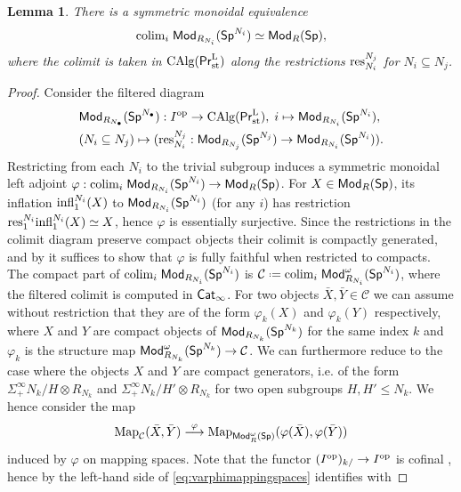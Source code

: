 \documentclass[reqno]{amsart}
\numberwithin{equation}{section}\theoremstyle{thms}
\newtheorem{lem}[equation]{Lemma}
\theoremstyle{defn}
\newcommand{\cC}{\mathcal{C}}
\newcommand{\tn}[1]{\textnormal{#1}}
\newcommand{\tsf}[1]{\textsf{\textup{#1}}}
\newcommand*{\defeq}{\mathrel{\vcenter{\baselineskip0.4ex \lineskiplimit0pt
\hbox{\scriptsize.}\hbox{\scriptsize.}}}%
=}
\newcommand{\op}{\tn{op}}
\newcommand{\Map}{\tn{Map}}
\newcommand{\calg}{\tn{CAlg}}
\newcommand{\Mod}{\tsf{Mod}}
\newcommand{\spec}{\tsf{Sp}}
\newcommand{\catinf}{\tsf{Cat}_{\infty}}
\newcommand{\prlst}{\tsf{Pr}^{\tn{L}}_{\tn{st}}}
\begin{document}
\begin{lem}\label{lem:spectraascolimit}
There is a symmetric monoidal equivalence 
$$\tn{colim}_i \; \Mod_{R_{N_i}}(\spec^{N_i}) \simeq \Mod_{R}(\spec),$$
where the colimit is taken in $\calg(\prlst)$ along the restrictions $\tn{res}^{N_j}_{N_i}$ for $N_i \subseteq N_j$.
\end{lem}
\begin{proof}
Consider the filtered diagram 
\begin{align*}
&\Mod_{R_{N_{\bullet}}}(\spec^{N_\bullet}): I^\op \to \calg(\prlst), \; i \mapsto \Mod_{R_{N_i}}(\spec^{N_i}), \\
&(N_i \subseteq N_j) \mapsto (\tn{res}_{N_i}^{N_j}: \Mod_{R_{N_j}}(\spec^{N_j}) \to \Mod_{R_{N_i}}(\spec^{N_i})).
\end{align*}
Restricting from each $N_i$ to the trivial subgroup induces a symmetric monoidal left adjoint $\varphi: \tn{colim}_i \; \Mod_{R_{N_i}}(\spec^{N_i}) \to \Mod_{R}(\spec)$. For $X \in \Mod_{R}(\spec)$, its inflation $\tn{infl}^{N_i}_1(X)$ to $\Mod_{R_{N_i}}(\spec^{N_i})$ (for any $i$) has restriction $\tn{res}^{N_i}_1\tn{infl}^{N_i}_1(X) \simeq X$, hence $\varphi$ is essentially surjective. Since the restrictions in the colimit diagram preserve compact objects their colimit is compactly generated, and by \cite[Proposition 5.3.5.11]{lur09} it suffices to show that $\varphi$ is fully faithful when restricted to compacts. \\
The compact part of $\tn{colim}_i \; \Mod_{R_{N_i}}(\spec^{N_i})$ is $\cC \defeq \tn{colim}_i \; \Mod_{R_{N_i}}^{\omega}(\spec^{N_i})$, where the filtered colimit is computed in $\catinf$. For two objects $\bar{X}, \bar{Y} \in \cC$ we can assume without restriction that they are of the form $\varphi_k(X)$ and $\varphi_k(Y)$ respectively, where $X$ and $Y$ are compact objects of $\Mod_{R_{N_k}}(\spec^{N_k})$ for the same index $k$ and $\varphi_k$ is the structure map $\Mod_{R_{N_k}}^{\omega}(\spec^{N_k}) \to \cC$. We can furthermore reduce to the case where the objects $X$ and $Y$ are compact generators, i.e. of the form $\Sigma^{\infty}_+ N_k/H \otimes R_{N_k}$ and $\Sigma^{\infty}_+ N_k/H' \otimes R_{N_k}$ for two open subgroups $H,H' \leq N_k$. We hence consider the map
\begin{equation}\label{eq:varphimappingspaces}
\Map_{\cC}(\bar{X},\bar{Y}) \stackrel{\varphi}{\longrightarrow} \Map_{\Mod_{R}^{\omega}(\spec)}(\varphi(\bar{X}),\varphi(\bar{Y}))
\end{equation}
induced by $\varphi$ on mapping spaces. Note that the functor $(I^\op)_{k/} \to I^\op$ is cofinal \cite[Example 5.4.5.9, Lemma 5.4.5.12]{lur09}, hence by \cite[Proposition 4.1.1.8]{lur09} the left-hand side of \ref{eq:varphimappingspaces} identifies with 

\end{proof}
\end{document}
